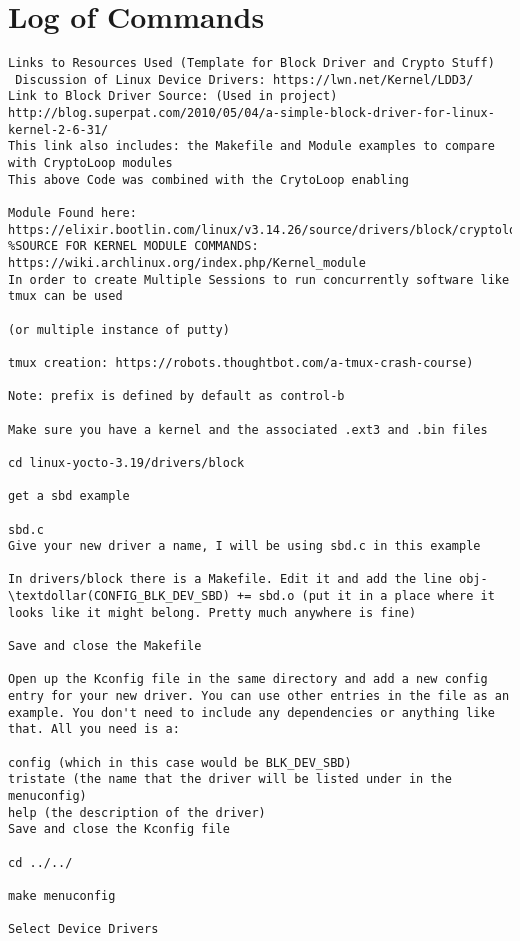 \documentclass[onecolumn, draftclsnofoot,10pt, compsoc]{IEEEtran}
\begin{document}
\section{Log of Commands}
\begin{verbatim}
Links to Resources Used (Template for Block Driver and Crypto Stuff)
 Discussion of Linux Device Drivers: https://lwn.net/Kernel/LDD3/
Link to Block Driver Source: (Used in project) http://blog.superpat.com/2010/05/04/a-simple-block-driver-for-linux-kernel-2-6-31/
This link also includes: the Makefile and Module examples to compare with CryptoLoop modules
This above Code was combined with the CrytoLoop enabling 

Module Found here: https://elixir.bootlin.com/linux/v3.14.26/source/drivers/block/cryptoloop.c
%SOURCE FOR KERNEL MODULE COMMANDS: https://wiki.archlinux.org/index.php/Kernel_module
In order to create Multiple Sessions to run concurrently software like tmux can be used

(or multiple instance of putty)

tmux creation: https://robots.thoughtbot.com/a-tmux-crash-course)

Note: prefix is defined by default as control-b

Make sure you have a kernel and the associated .ext3 and .bin files

cd linux-yocto-3.19/drivers/block

get a sbd example

sbd.c
Give your new driver a name, I will be using sbd.c in this example

In drivers/block there is a Makefile. Edit it and add the line obj-\textdollar(CONFIG_BLK_DEV_SBD) += sbd.o (put it in a place where it looks like it might belong. Pretty much anywhere is fine)

Save and close the Makefile

Open up the Kconfig file in the same directory and add a new config entry for your new driver. You can use other entries in the file as an example. You don't need to include any dependencies or anything like that. All you need is a:

config (which in this case would be BLK_DEV_SBD)
tristate (the name that the driver will be listed under in the menuconfig)
help (the description of the driver)
Save and close the Kconfig file

cd ../../

make menuconfig

Select Device Drivers


\end{verbatim}
\end{document}
